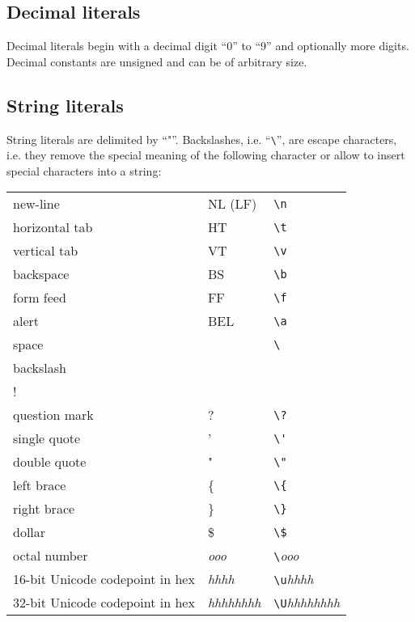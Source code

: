 \subsection{Decimal literals}

Decimal literals begin with a decimal digit ``0'' to ``9'' and
optionally more digits. Decimal constants are unsigned and can
be of arbitrary size.

\subsection{String literals}\label{stringlit}

String literals are delimited by ``"''. Backslashes,
i.e. ``\lstinline!\!'',
are escape characters, i.e. they remove the special meaning of
the following character or allow to insert special characters into a
string:

\bigskip

\noindent
\begin{tabular}{| l l l |}
\hline
new-line & NL (LF) & \lstinline!\n! \\
horizontal tab & HT & \lstinline!\t! \\
vertical tab & VT & \lstinline!\v! \\
backspace & BS & \lstinline!\b! \\
form feed & FF & \lstinline!\f! \\
alert & BEL & \lstinline!\a! \\
space & & \lstinline!\ ! \\
backslash & \backslashSY{} & \lstinline!\\! \\
question mark & ? & \lstinline!\?! \\
single quote & ' & \lstinline!\'! \\
double quote & " & \lstinline!\"! \\
left brace & \{ & \lstinline!\{! \\
right brace & \} & \lstinline!\}! \\
dollar & \$ & \lstinline!\$! \\
octal number & \textit{ooo} & \lstinline!\!\textit{ooo} \\
16-bit Unicode codepoint in hex & \textit{hhhh} & \lstinline!\u!\textit{hhhh} \\
32-bit Unicode codepoint in hex & \textit{hhhhhhhh}
   & \lstinline!\U!\textit{hhhhhhhh} \\
\hline
\end{tabular}

